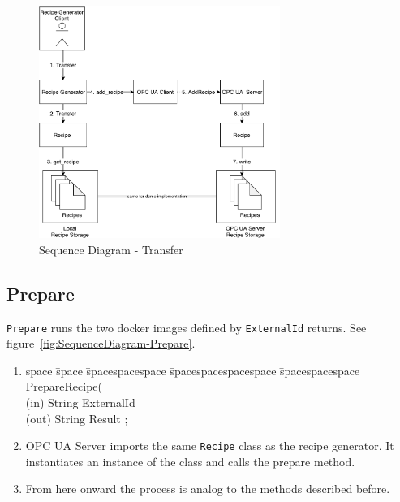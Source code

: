 \begin{figure}[ht]
	\centering
  \includegraphics[width=0.7\textwidth]{img/SequenceDiagram-Transfer.pdf}
	\caption{Sequence Diagram - Transfer}
	\label{fig:SequenceDiagram-Transfer}
\end{figure}

\subsection{Prepare}
\texttt{Prepare} runs the two docker images defined by \texttt{ExternalId} returns. See figure~\ref{fig:SequenceDiagram-Prepare}.

\begin{enumerate}
    \item 
    \begin{tabbing}
    space \= space \= spacespacespace \= spacespacespacespace \= spacespacespace \kill
    \>  PrepareRecipe(\\
    \>  \>  (in)	 \> 	String          \> ExternalId\\
    \>  \>  (out)	 \> 	String          \> Result ; 
    \end{tabbing}
    \item OPC UA Server imports the same \texttt{Recipe} class as the recipe generator. It instantiates an instance of the class and calls the prepare method.
    \item From here onward the process is analog to the methods described before.
\end{enumerate}

